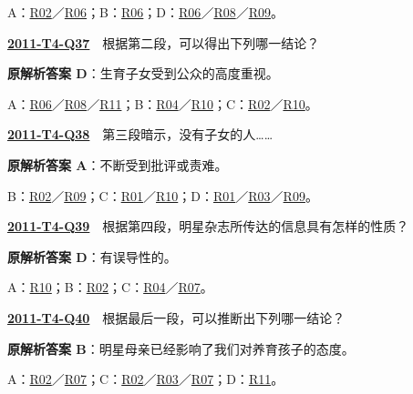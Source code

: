\documentclass[11pt,a4paper]{article}
\begin{document}
\noindent A：\hyperref[cat-R02]{R02}／\hyperref[cat-R06]{R06}；B：\hyperref[cat-R06]{R06}；D：\hyperref[cat-R06]{R06}／\hyperref[cat-R08]{R08}／\hyperref[cat-R09]{R09}。\par\smallskip
{}\label{idx-2011-T4-Q37}\noindent\textbf{\href{https://zj139.github.io/math-notes/english/e9415d068acb3ef20c371d2c/\#q37}{2011-T4-Q37}}　根据第二段，可以得出下列哪一结论？\par\nopagebreak
\noindent\textbf{原解析答案 D}：生育子女受到公众的高度重视。\par\nopagebreak
\noindent A：\hyperref[cat-R06]{R06}／\hyperref[cat-R08]{R08}／\hyperref[cat-R11]{R11}；B：\hyperref[cat-R04]{R04}／\hyperref[cat-R10]{R10}；C：\hyperref[cat-R02]{R02}／\hyperref[cat-R10]{R10}。\par\smallskip
{}\label{idx-2011-T4-Q38}\noindent\textbf{\href{https://zj139.github.io/math-notes/english/e9415d068acb3ef20c371d2c/\#q38}{2011-T4-Q38}}　第三段暗示，没有子女的人……\par\nopagebreak
\noindent\textbf{原解析答案 A}：不断受到批评或责难。\par\nopagebreak
\noindent B：\hyperref[cat-R02]{R02}／\hyperref[cat-R09]{R09}；C：\hyperref[cat-R01]{R01}／\hyperref[cat-R10]{R10}；D：\hyperref[cat-R01]{R01}／\hyperref[cat-R03]{R03}／\hyperref[cat-R09]{R09}。\par\smallskip
{}\label{idx-2011-T4-Q39}\noindent\textbf{\href{https://zj139.github.io/math-notes/english/e9415d068acb3ef20c371d2c/\#q39}{2011-T4-Q39}}　根据第四段，明星杂志所传达的信息具有怎样的性质？\par\nopagebreak
\noindent\textbf{原解析答案 D}：有误导性的。\par\nopagebreak
\noindent A：\hyperref[cat-R10]{R10}；B：\hyperref[cat-R02]{R02}；C：\hyperref[cat-R04]{R04}／\hyperref[cat-R07]{R07}。\par\smallskip
{}\label{idx-2011-T4-Q40}\noindent\textbf{\href{https://zj139.github.io/math-notes/english/e9415d068acb3ef20c371d2c/\#q40}{2011-T4-Q40}}　根据最后一段，可以推断出下列哪一结论？\par\nopagebreak
\noindent\textbf{原解析答案 B}：明星母亲已经影响了我们对养育孩子的态度。\par\nopagebreak
\noindent A：\hyperref[cat-R02]{R02}／\hyperref[cat-R07]{R07}；C：\hyperref[cat-R02]{R02}／\hyperref[cat-R03]{R03}／\hyperref[cat-R07]{R07}；D：\hyperref[cat-R11]{R11}。\par\smallskip
\clearpage
\end{document}
